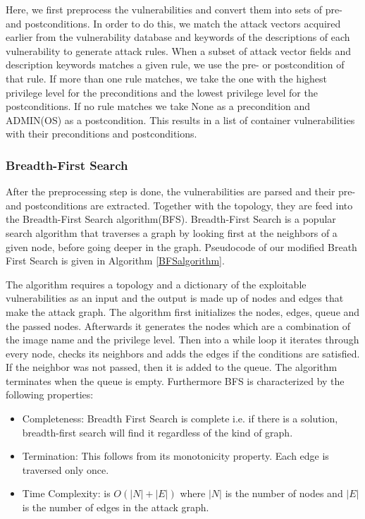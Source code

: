 	Here, we first preprocess the vulnerabilities and convert them into sets of pre- and postconditions. In order to do this, we match the attack vectors acquired earlier from the vulnerability database and keywords of the descriptions of each vulnerability to generate attack rules. When a subset of attack vector fields and description keywords matches a given rule, we use the pre- or postcondition of that rule. If more than one rule matches, we take the one with the highest privilege level for the preconditions and the lowest privilege level for the postconditions. If no rule matches we take None as a precondition and ADMIN(OS) as a postcondition. This results in a list of container vulnerabilities with their preconditions and postconditions.
	
	\subsubsection{Breadth-First Search}
	
	After the preprocessing step is done, the vulnerabilities are parsed and their pre- and postconditions are extracted. Together with the topology, they are feed into the Breadth-First Search algorithm(BFS).
	Breadth-First Search is a popular search algorithm that traverses a graph by looking first at the neighbors of a given node, before going deeper in the graph. Pseudocode of our modified Breath First Search is given in Algorithm \ref{BFSalgorithm}. 
	
	The algorithm requires a topology and a dictionary of the exploitable vulnerabilities as an input and the output is made up of nodes and edges that make the attack graph. 
	The algorithm first initializes the nodes, edges, queue and the passed nodes. Afterwards it generates the nodes which are a combination of the image name and the privilege level.
	Then into a while loop it iterates through every node, checks its neighbors and adds the edges if the conditions are satisfied. If the neighbor was not passed, then it is added to the queue. The algorithm terminates when the queue is empty. Furthermore BFS is characterized by the following properties:
	
	\begin{itemize}
		\item Completeness: Breadth First Search is complete i.e. if there is a solution, breadth-first search will find it regardless of the kind of graph.
		\item Termination: This follows from its monotonicity property. Each edge is traversed only once.
		\item Time Complexity: is $O(|N| + |E|)$ where $|N|$ is the number of nodes and $|E|$ is the number of edges in the attack graph.
	\end{itemize}

